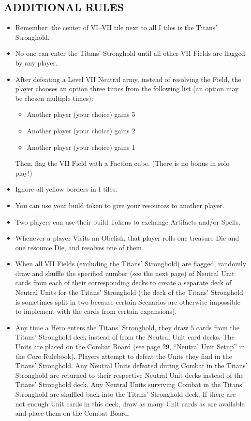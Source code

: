 \begin{multicols*}{2}
\subsection*{\MakeUppercase{Additional Rules}}
\begin{itemize}
  \item Remember: the center of VI--VII tile next to all I tiles is the Titans' Stronghold.
  \item No one can enter the Titans' Stronghold until all other VII Fields are flagged by any player.
  \item After defeating a Level VII Neutral army, instead of resolving the Field, the player chooses an option three times from the following list (an option may be chosen multiple times):
    \begin{itemize}
      \item Another player (your choice) gains 5\,
      \item Another player (your choice) gains 2\,
      \item Another player (your choice) gains 1\,
    \end{itemize}
  Then, flag the VII Field with a Faction cube.
  (There is no bonus in solo play!)
  \item Ignore all yellow borders in I tiles.
  \item You can use your build token to give your resources to another player.
  \item Two players can use their build Tokens to exchange Artifacts and/or Spells.
  \item Whenever a player Visits an Obelisk, that player rolls one treasure Die and one resource Die, and resolves one of them.
  \item When all VII Fields (excluding the Titans' Stronghold) are flagged, randomly draw and shuffle the specified number (see the next page) of Neutral Unit cards from each of their corresponding decks to create a separate deck of Neutral Units for the Titans' Stronghold (the deck of the Titans' Stronghold is sometimes split in two because certain Scenarios are otherwise impossible to implement with the cards from certain expansions).
  \item Any time a Hero enters the Titans' Stronghold, they draw 5 cards from the Titans' Stronghold deck instead of from the Neutral Unit card decks. The Units are placed on the Combat Board (see page 29, ``Neutral Unit Setup'' in the Core Rulebook). Players attempt to defeat the Units they find in the Titans' Stronghold. Any Neutral Units defeated during Combat in the Titans' Stronghold are returned to their respective Neutral Unit decks instead of the Titans' Stronghold deck. Any Neutral Units surviving Combat in the Titans' Stronghold are shuffled back into the Titans' Stronghold deck. If there are not enough Unit cards in this deck, draw as many Unit cards as are available and place them on the Combat Board.

\end{itemize}
\end{multicols*}
